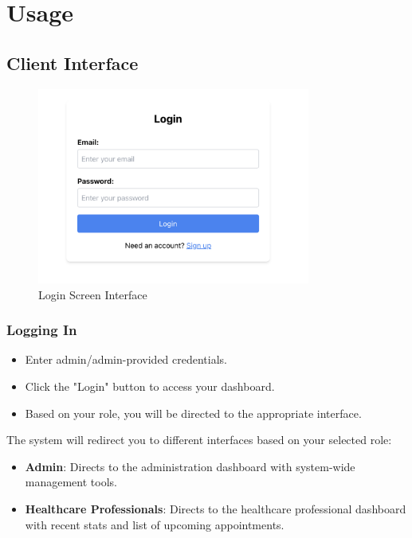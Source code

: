\documentclass[12pt, titlepage]{article}
\begin{document}
\newpage

\section{Usage}
\subsection{Client Interface}
\begin{figure}[H]
\centering
\includegraphics[width=0.8\textwidth]{login.png}
\caption{Login Screen Interface}
\label{fig:login}
\end{figure}

\subsubsection{Logging In}
\begin{itemize}
\item Enter admin/admin-provided credentials.
\item Click the "Login" button to access your dashboard.
\item Based on your role, you will be directed to the appropriate interface.
\end{itemize}

The system will redirect you to different interfaces based on your selected role:
\begin{itemize}
\item \textbf{Admin}: Directs to the administration dashboard with system-wide management tools.
\item \textbf{Healthcare Professionals}: Directs to the healthcare professional dashboard with recent stats and list of upcoming appointments.
\end{itemize}
\end{document}
